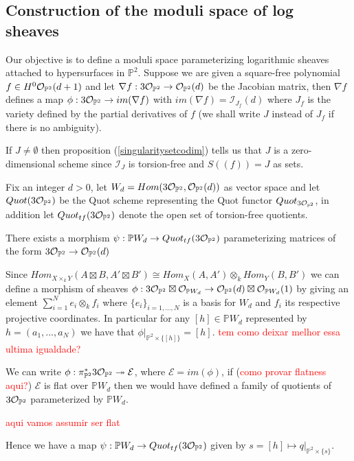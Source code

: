 \subsection{Construction of the moduli space of log sheaves}
Our objective is to define a moduli space parameterizing logarithmic sheaves attached to hypersurfaces in $\mathbb{P}^2$. Suppose we are given a square-free polynomial $f \in H^0 \mathcal{O}_{\mathbb{P}^2}(d+1)$ and let $\nabla f: 3\mathcal{O}_{\mathbb{P}^2} \to \mathcal{O}_{\mathbb{P}^2}(d)$ be the Jacobian matrix, then $\nabla f$ defines a map $\phi:3\mathcal{O}_{\mathbb{P}^2} \to im(\nabla f)$ with $im(\nabla f) = \mathcal{I}_{J_{f}}(d)$ where $J_{f}$ is the variety defined by the partial derivatives of $f$ (we shall write $J$ instead of $J_{f}$ if there is no ambiguity).

\begin{remark}
If $J \not= \emptyset$ then proposition (\ref{singularitysetcodim}) tells us that $J$ is a zero-dimensional scheme since $\mathcal{I}_J$ is torsion-free and $S((f)) = J$ as sets.
\end{remark}

Fix an integer $d>0$, let $W_d = Hom(3\mathcal{O}_{\mathbb{P}^2},\mathcal{O}_{\mathbb{P}^2}(d))$ as vector space and let $Quot(3\mathcal{O}_{\mathbb{P}^2})$ be the Quot scheme representing the Quot functor $Quot_{3\mathcal{O}_{\mathbb{P}^2}}$, in addition let $Quot_{tf}(3\mathcal{O}_{\mathbb{P}^2})$ denote the open set of torsion-free quotients.

\begin{lemma}
There exists a morphism $\psi:\mathbb{P}W_d \to Quot_{tf}(3\mathcal{O}_{\mathbb{P}^2})$ parameterizing matrices of the form $3\mathcal{O}_{\mathbb{P}^2} \to \mathcal{O}_{\mathbb{P}^2}(d)$
\end{lemma}
\begin{dem*}
Since $Hom_{X \times_k Y}(A \boxtimes B , A' \boxtimes B') \cong Hom_X(A,A') \otimes_k Hom_Y(B,B')$ \cite[\href{https://stacks.math.columbia.edu/tag/0BEC}{Tag 0BEC}]{stacks-project} we can define a morphism of sheaves $\phi:3\mathcal{O}_{\mathbb{P}^2} \boxtimes \mathcal{O}_{\mathbb{P}W_d} \to \mathcal{O}_{\mathbb{P}^2}(d) \boxtimes \mathcal{O}_{\mathbb{P}W_d}(1)$ by giving an element $\sum_{i=1}^N e_i \otimes_k f_i$ where $\{e_i\}_{i=1,...,N}$ is a basis for $W_d$ and $f_i$ its respective projective coordinates. In particular for any $[h] \in \mathbb{P}W_d$ represented by $h = (a_1,...,a_N)$ we have that $\phi|_{\mathbb{P}^2 \times \{[h] \}} = [h]$. \textcolor{red}{tem como deixar melhor essa ultima igualdade?}

We can write $\phi:\pi_{\mathbb{P}^2}^* 3\mathcal{O}_{\mathbb{P}^2} \twoheadrightarrow \mathcal{E}$, where $\mathcal{E} = im(\phi)$, if (\textcolor{red}{como provar flatness aqui?}) $\mathcal{E}$ is flat over $\mathbb{P}W_d$ then we would have defined a family of quotients of $3\mathcal{O}_{\mathbb{P}^2}$ parameterized by $\mathbb{P}W_d$.

\textcolor{red}{aqui vamos assumir ser flat}

Hence we have a map $\psi:\mathbb{P}W_d \to Quot_{tf}(3\mathcal{O}_{\mathbb{P}^2})$ given by $s=[h] \mapsto q|_{\mathbb{P}^2 \times \{s \}}$.
\end{dem*}

